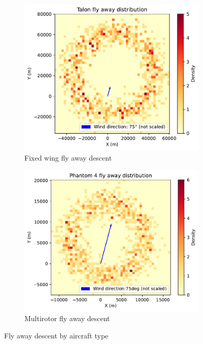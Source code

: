 \documentclass[12pt]{report}
\begin{document}
        \begin{figure}[H]
            \centering
            \begin{subfigure}[b]{0.45\textwidth}
                \centering
                \includegraphics[width=\textwidth]{Plot/talon/Talon_fly_away_distribution.pdf}
                \caption{Fixed wing fly away descent}
                \label{fig:fixed_wing}
            \end{subfigure}
            \hfill
            \begin{subfigure}[b]{0.45\textwidth}
                \centering
                \includegraphics[width=\textwidth]{Plot/phantom4/Phantom_4_fly_away_distribution.pdf}
                \caption{Multirotor fly away descent}
                \label{fig:multirotor}
            \end{subfigure}
            \caption{Fly away descent by aircraft type}
            \label{fig:ballistic_descent}
        \end{figure}
\end{document}
